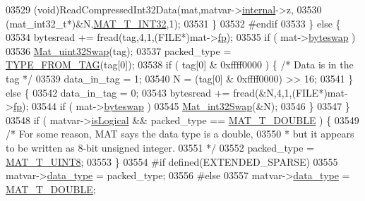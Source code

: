 \begin{DoxyCode}
{{{{{{{{{{{{{{{{{{03529                     (void)ReadCompressedInt32Data(mat,matvar->\hyperlink{group___m_a_t_a6e97e3ed9f40c49322c18561c2a94e92}{internal}->z,
03530                              (mat\_int32\_t*)&N,\hyperlink{group___m_a_t_ggacf7b3b879282b7ab3a51190e49bf3453a83e06a68320726c6572bfbb9f3addb1d}{MAT\_T\_INT32},1);
03531                 \}
03532 \textcolor{preprocessor}{#endif}
03533             \} \textcolor{keywordflow}{else} \{
03534                 bytesread += fread(tag,4,1,(FILE*)mat->\hyperlink{struct__mat__t_a85f562e407ca9ad4d2a6e14f839432b7}{fp});
03535                 \textcolor{keywordflow}{if} ( mat->\hyperlink{struct__mat__t_a99d207977af5e04941ace56d71817a40}{byteswap} )
03536                     \hyperlink{endian_8c_a8cb0d0750e2eaf9840d95db531934f4f}{Mat\_uint32Swap}(tag);
03537                 packed\_type = \hyperlink{mat5_8c_a82bacecc4afc633b61bc3dc8ef88d1ed}{TYPE\_FROM\_TAG}(tag[0]);
03538                 \textcolor{keywordflow}{if} ( tag[0] & 0xffff0000 ) \{ \textcolor{comment}{/* Data is in the tag */}
03539                     data\_in\_tag = 1;
03540                     N = (tag[0] & 0xffff0000) >> 16;
03541                 \} \textcolor{keywordflow}{else} \{
03542                     data\_in\_tag = 0;
03543                     bytesread += fread(&N,4,1,(FILE*)mat->\hyperlink{struct__mat__t_a85f562e407ca9ad4d2a6e14f839432b7}{fp});
03544                     \textcolor{keywordflow}{if} ( mat->\hyperlink{struct__mat__t_a99d207977af5e04941ace56d71817a40}{byteswap} )
03545                         \hyperlink{endian_8c_a2e0153996243f0a34df9a5286087cfa3}{Mat\_int32Swap}(&N);
03546                 \}
03547             \}
03548             \textcolor{keywordflow}{if} ( matvar->\hyperlink{group___m_a_t_a866c1539e68073a837833d74cd4a65be}{isLogical} && packed\_type == \hyperlink{group___m_a_t_ggacf7b3b879282b7ab3a51190e49bf3453a31e721ecf7e188196f83c32838288797}{MAT\_T\_DOUBLE} ) \{
03549                 \textcolor{comment}{/* For some reason, MAT says the data type is a double,}
03550 \textcolor{comment}{                 * but it appears to be written as 8-bit unsigned integer.}
03551 \textcolor{comment}{                 */}
03552                 packed\_type = \hyperlink{group___m_a_t_ggacf7b3b879282b7ab3a51190e49bf3453a01c1bd7db68f90552862eb5d311be408}{MAT\_T\_UINT8};
03553             \}
03554 \textcolor{preprocessor}{#if defined(EXTENDED\_SPARSE)}
03555             matvar->\hyperlink{group___m_a_t_ab6aafe9bd77f0f077852593dec438144}{data\_type} = packed\_type;
03556 \textcolor{preprocessor}{#else}
03557             matvar->\hyperlink{group___m_a_t_ab6aafe9bd77f0f077852593dec438144}{data\_type} = \hyperlink{group___m_a_t_ggacf7b3b879282b7ab3a51190e49bf3453a31e721ecf7e188196f83c32838288797}{MAT\_T\_DOUBLE};
}}}}}}}}}}}}}}}}}}
\end{DoxyCode}
